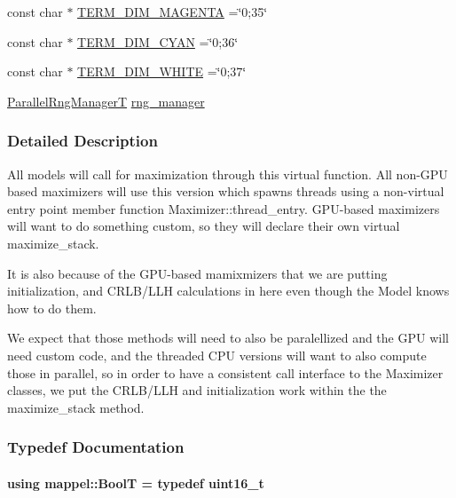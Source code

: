 \begin{DoxyCompactItemize}
\item 
const char $\ast$ \hyperlink{namespacemappel_add36264e8025d4db88e03897ecda89b5}{T\+E\+R\+M\+\_\+\+D\+I\+M\+\_\+\+M\+A\+G\+E\+N\+TA} =\char`\"{}0;35\char`\"{}
\item 
const char $\ast$ \hyperlink{namespacemappel_ad168ab0229814251071c6680e9792b0f}{T\+E\+R\+M\+\_\+\+D\+I\+M\+\_\+\+C\+Y\+AN} =\char`\"{}0;36\char`\"{}
\item 
const char $\ast$ \hyperlink{namespacemappel_a15d16c02d9b595b272213768978e691b}{T\+E\+R\+M\+\_\+\+D\+I\+M\+\_\+\+W\+H\+I\+TE} =\char`\"{}0;37\char`\"{}
\item 
\hyperlink{namespacemappel_acf276a4212f07b1ed4cb2ddce379ba1d}{Parallel\+Rng\+ManagerT} \hyperlink{namespacemappel_abe2a4321a80f2384995f3c288131d4c0}{rng\+\_\+manager}
\end{DoxyCompactItemize}


\subsubsection{Detailed Description}
All models will call for maximization through this virtual function. All non-\/\+G\+PU based maximizers will use this version which spawns threads using a non-\/virtual entry point member function Maximizer\+::thread\+\_\+entry. G\+P\+U-\/based maximizers will want to do something custom, so they will declare their own virtual maximize\+\_\+stack.

It is also because of the G\+P\+U-\/based mamixmizers that we are putting initialization, and C\+R\+L\+B/\+L\+LH calculations in here even though the Model knows how to do them.

We expect that those methods will need to also be paralellized and the G\+PU will need custom code, and the threaded C\+PU versions will want to also compute those in parallel, so in order to have a consistent call interface to the Maximizer classes, we put the C\+R\+L\+B/\+L\+LH and initialization work within the the maximize\+\_\+stack method. 

\subsubsection{Typedef Documentation}
\paragraph[{\texorpdfstring{BoolT}{BoolT}}]{\setlength{\rightskip}{0pt plus 5cm}using {\bf mappel\+::\+BoolT} = typedef uint16\+\_\+t}\hypertarget{namespacemappel_a74f3ebfb073cdde8b57926847deb4daa}{}\label{namespacemappel_a74f3ebfb073cdde8b57926847deb4daa}


